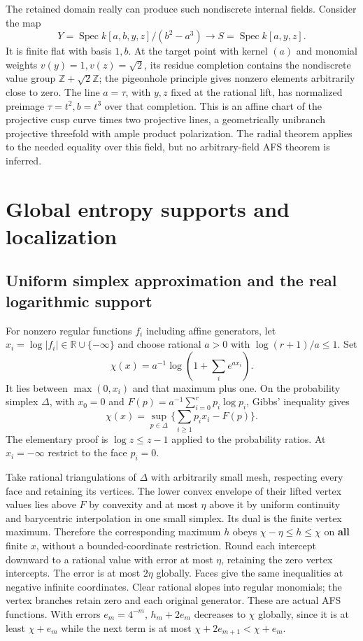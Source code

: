 \documentclass[
  11pt,
]{article}
\begin{document}
The retained domain really can produce such nondiscrete internal fields.
Consider the map
\[Y=\operatorname{Spec}k[a,b,y,z]/(b^2-a^3)\longrightarrow
S=\operatorname{Spec}k[a,y,z].\] It is finite flat with basis \(1,b\).
At the target point with kernel \((a)\) and monomial weights
\(v(y)=1,v(z)=\sqrt2\), its residue completion contains the nondiscrete
value group \(\mathbb Z+\sqrt2\mathbb Z\); the pigeonhole principle
gives nonzero elements arbitrarily close to zero. The line \(a=\tau\),
with \(y,z\) fixed at the rational lift, has normalized preimage
\(\tau=t^2,b=t^3\) over that completion. This is an affine chart of the
projective cusp curve times two projective lines, a geometrically
unibranch projective threefold with ample product polarization. The
radial theorem applies to the needed equality over this field, but no
arbitrary-field AFS theorem is inferred.

\section{Global entropy supports and
localization}\label{global-entropy-supports-and-localization}

\subsection{Uniform simplex approximation and the real logarithmic
support}\label{uniform-simplex-approximation-and-the-real-logarithmic-support}

For nonzero regular functions \(f_i\) including affine generators, let
\(x_i=\log|f_i|\in\mathbb R\cup\{-\infty\}\) and choose rational \(a>0\)
with \(\log(r+1)/a\le1\). Set \[\chi(x)=a^{-1}\log(1+\sum_i e^{ax_i}).\]
It lies between \(\max(0,x_i)\) and that maximum plus one. On the
probability simplex \(\Delta\), with \(x_0=0\) and
\(F(p)=a^{-1}\sum_{i=0}^r p_i\log p_i\), Gibbs' inequality gives
\[\chi(x)=\sup_{p\in\Delta}\{\sum_{i\ge1}p_ix_i-F(p)\}.                 \tag{16}\]
The elementary proof is \(\log z\le z-1\) applied to the probability
ratios. At \(x_i=-\infty\) restrict to the face \(p_i=0\).

Take rational triangulations of \(\Delta\) with arbitrarily small mesh,
respecting every face and retaining its vertices. The lower convex
envelope of their lifted vertex values lies above \(F\) by convexity and
at most \(\eta\) above it by uniform continuity and barycentric
interpolation in one small simplex. Its dual is the finite vertex
maximum. Therefore the corresponding maximum \(h\) obeys
\(\chi-\eta\le h\le\chi\) on \textbf{all} finite \(x\), without a
bounded-coordinate restriction. Round each intercept downward to a
rational value with error at most \(\eta\), retaining the zero vertex
intercepts. The error is at most \(2\eta\) globally. Faces give the same
inequalities at negative infinite coordinates. Clear rational slopes
into regular monomials; the vertex branches retain zero and each
original generator. These are actual AFS functions. With errors
\(e_m=4^{-m}\), \(h_m+2e_m\) decreases to \(\chi\) globally, since it is
at least \(\chi+e_m\) while the next term is at most
\(\chi+2e_{m+1}<\chi+e_m\).
\end{document}
